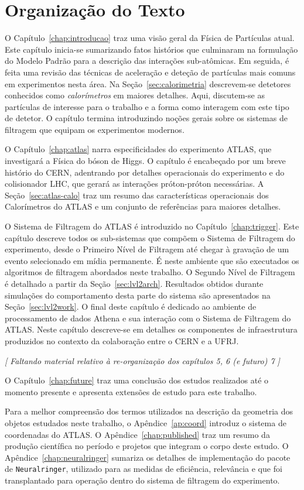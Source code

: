 \section{Organização do Texto}

O Capítulo~\ref{chap:introducao} traz uma visão geral da Física de Partículas
atual. Este capítulo inicia-se sumarizando fatos histórios que culminaram na
formulação do Modelo Padrão para a descrição das interações sub-atômicas. Em
seguida, é feita uma revisão das técnicas de aceleração e deteção de
partículas mais comuns em experimentos nesta área. Na
Seção~\ref{sec:calorimetria} descrevem-se detetores conhecidos como
\textit{calorímetros} em maiores detalhes. Aqui, discutem-se as partículas de
interesse para o trabalho e a forma como interagem com este tipo de detetor. O
capítulo termina introduzindo noções gerais sobre os sistemas de filtragem que
equipam os experimentos modernos.

O Capítulo~\ref{chap:atlas} narra especificidades do experimento ATLAS, que
investigará a Física do bóson de Higgs. O capítulo é encabeçado por um breve
histório do CERN, adentrando por detalhes operacionais do experimento e do
colisionador LHC, que gerará as interações próton-próton necessárias. A
Seção~\ref{sec:atlas-calo} traz um resumo das características operacionais dos
Calorímetros do ATLAS e um conjunto de referências para maiores detalhes.

O Sistema de Filtragem do ATLAS é introduzido no
Capítulo~\ref{chap:trigger}. Este capítulo descreve todos os sub-sistemas que
compõem o Sistema de Filtragem do experimento, desde o Primeiro Nível de
Filtragem até chegar à gravação de um evento selecionado em mídia
permanente. É neste ambiente que são executados os algoritmos de filtragem
abordados neste trabalho. O Segundo Nível de Filtragem é detalhado a partir da
Seção~\ref{sec:lvl2arch}. Resultados obtidos durante simulações do
comportamento desta parte do sistema são apresentados na
Seção~\ref{sec:lvl2work}. O final deste capítulo é dedicado ao ambiente de
processamento de dados Athena e sua interação com o Sistema de Filtragem do
ATLAS. Neste capítulo descreve-se em detalhes os componentes de infraestrutura
produzidos no contexto da colaboração entre o CERN e a UFRJ.

\textit{[ Faltando material relativo à re-organização dos capítulos 5, 6 (e futuro) 7 ]}

O Capítulo~\ref{chap:future} traz uma conclusão dos estudos realizados
até o momento presente e apresenta extensões de estudo para este trabalho.

Para a melhor compreensão dos termos utilizados na descrição da geometria dos
objetos estudados neste trabalho, o Apêndice~\ref{ap:coord} introduz o sistema
de coordenadas do ATLAS. O Apêndice~\ref{chap:published} traz um resumo da
produção científica no período e projetos que integram o corpo deste estudo. O
Apêndice~\ref{chap:neuralringer} sumariza os detalhes de implementação do
pacote de  \texttt{Neuralringer}, utilizado para as medidas de
eficiência, relevância e que foi transplantado para operação dentro do sistema
de filtragem do experimento.


